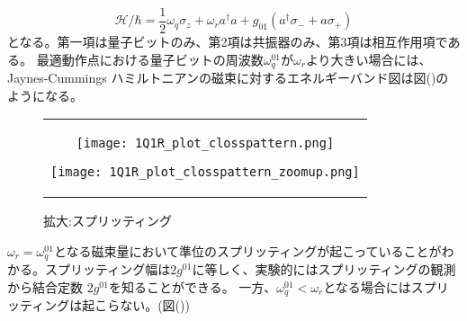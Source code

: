         \begin{equation}
            \mathcal{H} / \hbar=\frac{1}{2} \omega_{q} \sigma_{z}+\omega_{r} a^{\dagger} a+g_{01}\left(a^{\dagger} \sigma_{-}+a \sigma_{+}\right)
        \end{equation}
        となる。第一項は量子ビットのみ、第2項は共振器のみ、第3項は相互作用項である。
        最適動作点における量子ビットの周波数$\omega_q^{01}$が$\omega_r$より大きい場合には、Jaynes-Cummings ハミルトニアンの磁束に対するエネルギーバンド図は図()のようになる。
        \begin{figure}[H]
            \begin{center}
                \begin{tabular}{c}
                    \begin{minipage}{0.5\hsize}
                        \begin{center}
                            \texttt{[image: 1Q1R\_plot\_closspattern.png]}
                        \end{center}
                        \caption{$\omega_r<\omega_q^{01}$の場合の準位図}
                    \end{minipage}
                    
                    \begin{minipage}{0.5\hsize}
                        \begin{center}
                            \texttt{[image: 1Q1R\_plot\_closspattern\_zoomup.png]}
                        \end{center}
                        \caption{拡大:スプリッティング}
                    \end{minipage}
                \end{tabular}
            \end{center}
        \end{figure}
        $\omega_r=\omega_q^{01}$となる磁束量において準位のスプリッティングが起こっていることがわかる。スプリッティング幅は$2g^{01}$に等しく、実験的にはスプリッティングの観測から結合定数 $2g^{01}$を知ることができる。
        一方、$\omega_q^{01}<\omega_r$となる場合にはスプリッティングは起こらない。(図())
